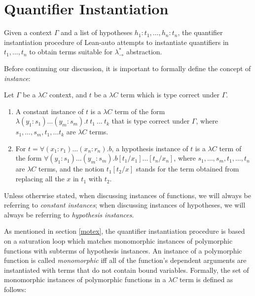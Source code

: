 \section{Quantifier Instantiation}
Given a context $\Gamma$ and a list of hypotheses $h_1 : t_1, \dots, h_n : t_n$, the quantifier
instantiation procedure of Lean-auto attempts to instantiate quantifiers in
$t_1, \dots, t_n$ to obtain terms suitable for $\lambda_\to^*$ abstraction.

\noindent Before continuing our discussion, it is important to formally define the concept of \textit{instance}:

\begin{definition}
  Let $\Gamma$ be a $\lambda C$ context, and $t$ be a $\lambda C$ term which is type correct under $\Gamma$.
  \begin{enumerate}
    \item A constant instance of $t$ is a $\lambda C$ term of the
      form $\lambda (y_1 : s_1) \dots (y_m : s_m). t \ t_1 \ \dots \ t_k$ that is
      type correct under $\Gamma$, where $s_1, \dots, s_m, t_1, \dots t_k$ are $\lambda C$ terms.
    \item For $t = \forall (x_1 : r_1) \dots (x_n : r_n). b$, a hypothesis instance of
      $t$ is a $\lambda C$ term of the form $\forall (y_1 : s_1) \dots (y_m : s_m). b[t_1/x_1]\dots[t_n/x_n]$,
      where $s_1, \dots, s_m, t_1, \dots, t_n$ are $\lambda C$ terms, and the notion $t_1[t_2/x]$ stands
      for the term obtained from replacing all the $x$ in $t_1$ with $t_2$.
  \end{enumerate}
\end{definition}

\noindent Unless otherwise stated, when discussing instances of functions, we will always be
referring to \textit{constant instances}; when discussing instances of hypotheses, we will
always be referring to \textit{hypothesis instances}.

\noindent As mentioned in section \ref{motex}, the quantifier instantiation procedure
is based on a saturation loop which matches monomorphic instances of polymorphic functions
with subterms of hypothesis instances. An instance of a polymorphic function is called
\textit{monomorphic} iff all of the function's dependent arguments are instantiated with terms
that do not contain bound variables. Formally, the set of monomorphic instances of polymorphic
functions in a $\lambda C$ term is defined as follows:

